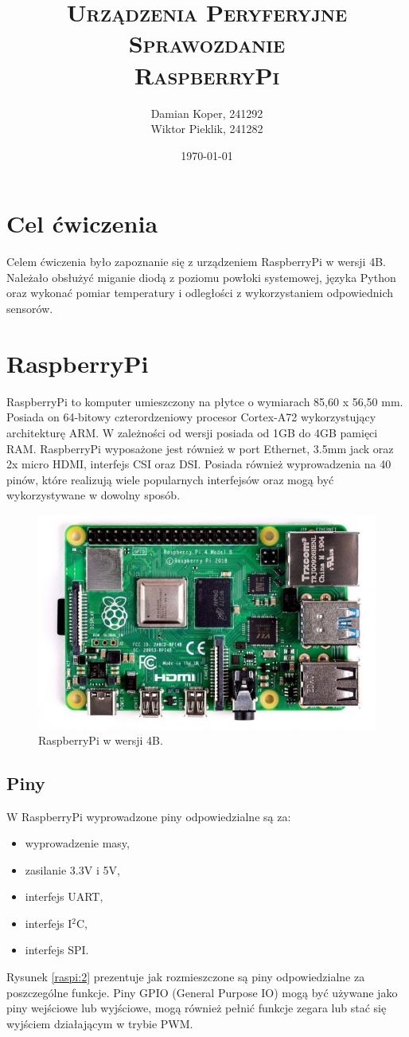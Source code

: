 \documentclass[12pt]{article}
\title{ 
    \vspace*{55mm}
    \textsc{
        \textbf{Urządzenia Peryferyjne}\\
        \large Sprawozdanie  \\
        \Large RaspberryPi
        }
}
\author{
Damian Koper,  241292\\
Wiktor Pieklik, 241282\\
}
\date{\today}
\begin{document}
\maketitle

\newpage
\localtableofcontents
\listoffigures
\lstlistoflistings

\newpage

\section{Cel ćwiczenia}
Celem ćwiczenia było zapoznanie się z urządzeniem RaspberryPi w wersji 4B\cite{raspi}. Należało obsłużyć miganie diodą z poziomu powłoki systemowej, języka Python oraz wykonać pomiar temperatury i odległości z wykorzystaniem odpowiednich sensorów.

\section{RaspberryPi}
RaspberryPi to komputer umieszczony na płytce o wymiarach 85,60 x 56,50 mm. Posiada on 64-bitowy czterordzeniowy procesor Cortex-A72 wykorzystujący architekturę ARM\cite{arm}. W zależności od wersji posiada od 1GB do 4GB pamięci RAM. RaspberryPi wyposażone jest również w port Ethernet, 3.5mm jack oraz 2x micro HDMI, interfejs CSI oraz DSI. Posiada również wyprowadzenia na 40 pinów, które realizują wiele popularnych interfejsów oraz mogą być wykorzystywane w dowolny sposób.

\begin{figure}[h]
  \centering
  \includegraphics[width=0.5\linewidth]{raspi}
  \caption{RaspberryPi w wersji 4B\cite{raspi:img}.}
  \label{raspi:1}
\end{figure}
\clearpage
\subsection{Piny}
W RaspberryPi wyprowadzone piny odpowiedzialne są za:
\begin{itemize}[noitemsep]
  \item wyprowadzenie masy,
  \item zasilanie 3.3V i 5V,
  \item interfejs UART,
  \item interfejs I$^2$C,
  \item interfejs SPI.
\end{itemize}
Rysunek \ref{raspi:2} prezentuje jak rozmieszczone są piny odpowiedzialne za poszczególne funkcje. Piny GPIO (General Purpose IO) mogą być używane jako piny wejściowe lub wyjściowe, mogą również pełnić funkcje zegara lub stać się wyjściem działającym w trybie PWM.
\end{document}
